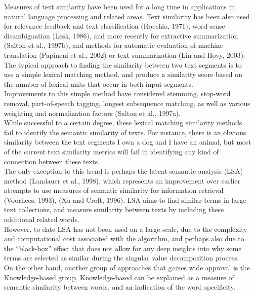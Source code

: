 Measures of text similarity have been used for a long time in applications in natural language processing and related areas. Text similarity has been also used for relevance feedback and text classification (Rocchio, 1971), word sense disambiguation (Lesk, 1986), and more recently for extractive summarization (Salton et al., 1997b), and methods for automatic evaluation of machine translation (Papineni et al., 2002) or text summarization (Lin and Hovy, 2003). \\
The typical approach to finding the similarity between two text segments is to use a simple lexical matching method, and produce a similarity score based on the number of lexical units that occur in both input segments. \\
Improvements to this simple method have considered stemming, stop-word removal, part-of-speech tagging, longest subsequence matching, as well as various weighting and normalization factors (Salton et al., 1997a).\\
While successful to a certain degree, these lexical matching similarity methods fail to identify the semantic similarity of texts. For instance, there is an obvious similarity between the text segments I own a dog and I have an animal, but most of the current text similarity metrics will fail in identifying any kind of connection between these texts. \\

The only exception to this trend is perhaps the latent semantic analysis (LSA) method (Landauer et al., 1998), which represents an improvement over earlier attempts to use measures of semantic similarity for information retrieval (Voorhees, 1993), (Xu and Croft, 1996). LSA aims to find similar terms in large text collections, and measure similarity between texts by including these additional related words. \\
However, to date LSA has not been used on a large scale, due to the complexity and computational cost associated with the algorithm, and perhaps also due to the “black-box” effect that does not allow for any deep insights into why some terms are selected as similar during the singular value decomposition process.\\

On the other hand, another group of approaches that gaines wide approval is the Knowledge-based group. Knowledge-based can be explained as a measure of semantic similarity between words, and an indication of the word specificity.\\

